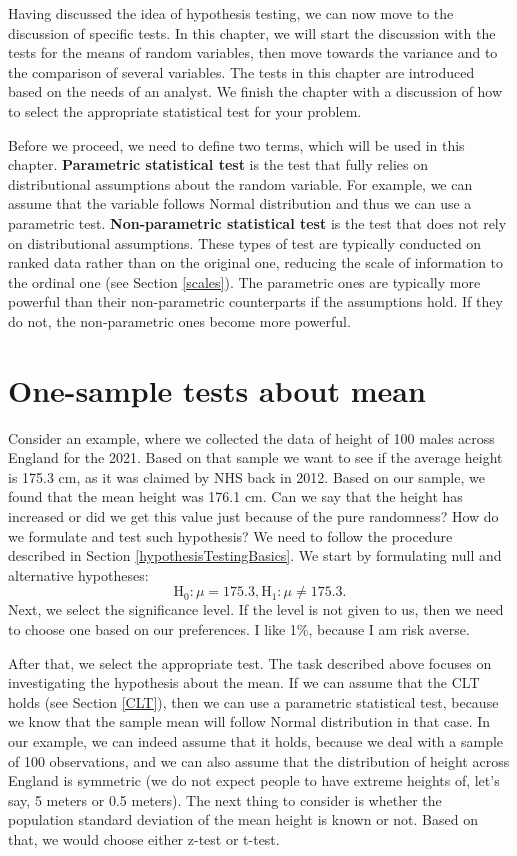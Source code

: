 \documentclass[
]{book}
\theoremstyle{definition}
\theoremstyle{definition}
\theoremstyle{definition}
\theoremstyle{definition}
\theoremstyle{remark}
\begin{document}
Having discussed the idea of hypothesis testing, we can now move to the discussion of specific tests. In this chapter, we will start the discussion with the tests for the means of random variables, then move towards the variance and to the comparison of several variables. The tests in this chapter are introduced based on the needs of an analyst. We finish the chapter with a discussion of how to select the appropriate statistical test for your problem.

Before we proceed, we need to define two terms, which will be used in this chapter. \textbf{Parametric statistical test} is the test that fully relies on distributional assumptions about the random variable. For example, we can assume that the variable follows Normal distribution and thus we can use a parametric test. \textbf{Non-parametric statistical test} is the test that does not rely on distributional assumptions. These types of test are typically conducted on ranked data rather than on the original one, reducing the scale of information to the ordinal one (see Section \ref{scales}). The parametric ones are typically more powerful than their non-parametric counterparts if the assumptions hold. If they do not, the non-parametric ones become more powerful.

\section{One-sample tests about mean}\label{statisticalTestsOneSampleMean}

Consider an example, where we collected the data of height of 100 males across England for the 2021. Based on that sample we want to see if the average height is 175.3 cm, as it was claimed by NHS back in 2012. Based on our sample, we found that the mean height was 176.1 cm. Can we say that the height has increased or did we get this value just because of the pure randomness? How do we formulate and test such hypothesis? We need to follow the procedure described in Section \ref{hypothesisTestingBasics}. We start by formulating null and alternative hypotheses:
\begin{equation*}
    \mathrm{H}_0: \mu = 175.3, \mathrm{H}_1: \mu \neq 175.3 .
\end{equation*}
Next, we select the significance level. If the level is not given to us, then we need to choose one based on our preferences. I like 1\%, because I am risk averse.

After that, we select the appropriate test. The task described above focuses on investigating the hypothesis about the mean. If we can assume that the CLT holds (see Section \ref{CLT}), then we can use a parametric statistical test, because we know that the sample mean will follow Normal distribution in that case. In our example, we can indeed assume that it holds, because we deal with a sample of 100 observations, and we can also assume that the distribution of height across England is symmetric (we do not expect people to have extreme heights of, let's say, 5 meters or 0.5 meters). The next thing to consider is whether the population standard deviation of the mean height is known or not. Based on that, we would choose either z-test or t-test.
\end{document}
